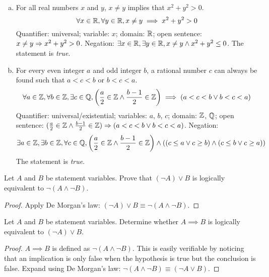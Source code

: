 \documentclass{agony}
\begin{document}
\begin{enumerate}[(a)]
  \item For all real numbers $x$ and $y$, $x \neq y$ implies that $x^2+y^2 > 0$.
        \[ \forall x\in\mathbb{R}, \forall y\in\mathbb{R}, x \neq y \implies x^2+y^2>0 \]
        Quantifier: universal;
        variable: $x$;
        domain: $\mathbb{R}$;
        open sentence: $x \neq y \Rightarrow x^2+y^2>0$.
        Negation: $\exists x\in\mathbb{R}, \exists y\in\mathbb{R}, x \neq y \land x^2+y^2\leq0$.
        The statement is \emph{true}.
  \item For every even integer $a$ and odd integer $b$, a rational number $c$ can always be found such that $a<c<b$ or $b<c<a$.
        \[
          \forall a\in\mathbb{Z}, \forall b\in\mathbb{Z}, \exists c\in\mathbb{Q},
          \left(\frac{a}{2}\in\mathbb{Z} \land \frac{b-1}{2}\in\mathbb{Z}\right) \implies (a<c<b \lor b<c<a)
        \]
        Quantifier: universal/existential;
        variables: $a$, $b$, $c$;
        domain: $\mathbb{Z}$, $\mathbb{Q}$;
        open sentence: $(\frac{a}{2}\in\mathbb{Z} \land \frac{b-1}{2}\in\mathbb{Z}) \Rightarrow (a<c<b \lor b<c<a)$.
        Negation:
        \[
          \exists a\in\mathbb{Z}, \exists b\in\mathbb{Z}, \forall c\in\mathbb{Q},
          \qty(\frac{a}{2}\in\mathbb{Z} \land \frac{b-1}{2}\in\mathbb{Z}) \land
          \qty((c \leq a \lor c \geq b) \land (c \leq b \lor c \geq a))
        \]
        The statement is \emph{true}.
\end{enumerate}


\question Let $A$ and $B$ be statement variables. Prove that $(\lnot A) \lor B$ is logically equivalent to $\lnot(A \land \lnot B)$.
\begin{proof}
  Apply De Morgan's law: $(\lnot A) \lor B \equiv \lnot(A \land \lnot B)$.
\end{proof}


\question Let $A$ and $B$ be statement variables. Determine whether $A \implies B$ is logically equivalent to $(\lnot A) \lor B$.
\begin{proof}
  $A \implies B$ is defined as $\lnot(A \land \lnot B)$.
  This is easily verifiable by noticing that an implication is only false when the hypothesis is true but the conclusion is false.
  Expand using De Morgan's law: $\lnot(A \land \lnot B) \equiv (\lnot A \lor B)$.
\end{proof}
\end{document}
